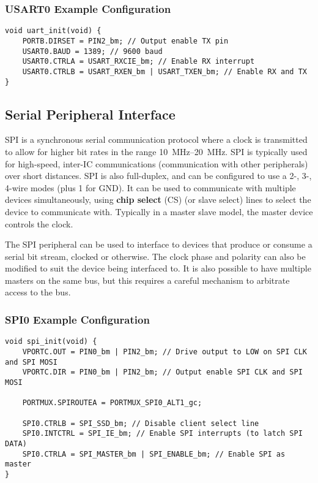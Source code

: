 \documentclass{report}
\begin{document}
\subsubsection{USART0 Example Configuration}
\begin{verbatim}
void uart_init(void) {
    PORTB.DIRSET = PIN2_bm; // Output enable TX pin
    USART0.BAUD = 1389; // 9600 baud
    USART0.CTRLA = USART_RXCIE_bm; // Enable RX interrupt
    USART0.CTRLB = USART_RXEN_bm | USART_TXEN_bm; // Enable RX and TX
}
\end{verbatim}
\subsection{Serial Peripheral Interface}
SPI is a synchronous serial communication protocol where a clock is
transmitted to allow for higher bit rates in the range
\qtyrange{10}{20}{MHz}. SPI is typically used for high-speed, inter-IC
communications (communication with other peripherals) over short
distances. SPI is also \linebreak full-duplex, and can be configured to
use a 2-, 3-, 4-wire modes (plus 1 for GND). It can be used to
communicate with multiple devices simultaneously, using \textbf{chip
select} (CS) (or slave select) lines to select the device to
communicate with. Typically in a master slave model, the master device
controls the clock.

The SPI peripheral can be used to interface to devices that produce or
consume a serial bit stream, clocked or otherwise. The clock phase and
polarity can also be modified to suit the device being interfaced to.
It is also possible to have multiple masters on the same bus, but this
requires a careful mechanism to arbitrate access to the bus.
\subsubsection{SPI0 Example Configuration}
\begin{verbatim}
void spi_init(void) {
    VPORTC.OUT = PIN0_bm | PIN2_bm; // Drive output to LOW on SPI CLK and SPI MOSI
    VPORTC.DIR = PIN0_bm | PIN2_bm; // Output enable SPI CLK and SPI MOSI

    PORTMUX.SPIROUTEA = PORTMUX_SPI0_ALT1_gc;

    SPI0.CTRLB = SPI_SSD_bm; // Disable client select line
    SPI0.INTCTRL = SPI_IE_bm; // Enable SPI interrupts (to latch SPI DATA)
    SPI0.CTRLA = SPI_MASTER_bm | SPI_ENABLE_bm; // Enable SPI as master
}
\end{verbatim}
\end{document}
